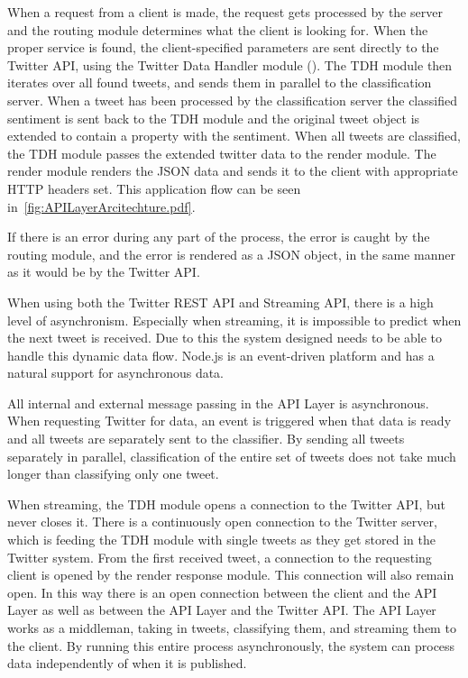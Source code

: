 When a request from a client is made, the request gets processed by the server and the routing module determines what the client is looking for. When the proper service is found, the client-specified parameters are sent directly to the Twitter API, using the Twitter Data Handler module (). The TDH module then iterates over all found tweets, and sends them in parallel to the classification server. When a tweet has been processed by the classification server the classified sentiment is sent back to the TDH module and the original tweet object is extended to contain a property with the sentiment. When all tweets are classified, the TDH module passes the extended twitter data to the render module. The render module renders the JSON data and sends it to the client with appropriate HTTP headers set. This application flow can be seen in~\autoref{fig:APILayerArcitechture.pdf}.

If there is an error during any part of the process, the error is caught by the routing module, and the error is rendered as a JSON object, in the same manner as it would be by the Twitter API. 

When using both the Twitter REST API and Streaming API, there is a high level of asynchronism. Especially when streaming, it is impossible to predict when the next tweet is received. Due to this the system designed needs to be able to handle this dynamic data flow. Node.js is an event-driven platform and has a natural support for asynchronous data. 

All internal and external message passing in the API Layer is asynchronous. When requesting Twitter for data, an event is triggered when that data is ready and all tweets are separately sent to the classifier. By sending all tweets separately in parallel, classification of the entire set of tweets does not take much longer than classifying only one tweet. 

When streaming, the TDH module opens a connection to the Twitter API, but never closes it. There is a continuously open connection to the Twitter server, which is feeding the TDH module with single tweets as they get stored in the Twitter system. From the first received tweet, a connection to the requesting client is opened by the render response module. This connection will also remain open. In this way there is an open connection between the client and the API Layer as well as between the API Layer and the Twitter API. The API Layer works as a middleman, taking in tweets, classifying them, and streaming them to the client. By running this entire process asynchronously, the system can process data independently of when it is published.


